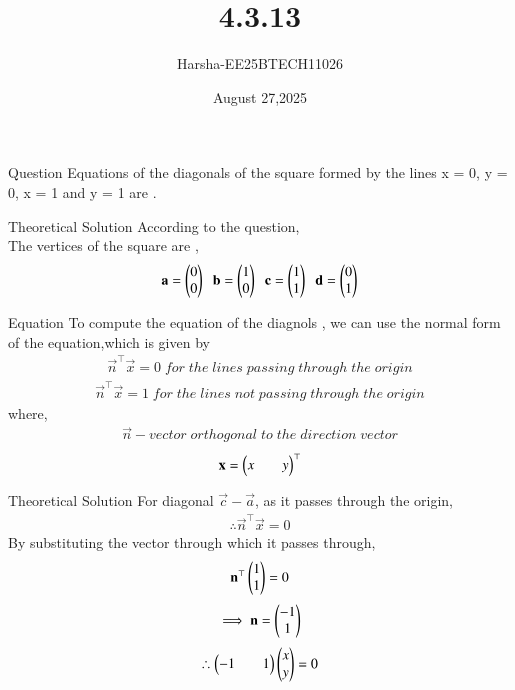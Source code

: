 \documentclass{beamer}
\title %
{4.3.13}
\date{August 27,2025}
\author %
{Harsha-EE25BTECH11026}
\begin{document}
\frame{\titlepage}
\begin{frame}{Question}
Equations of the diagonals of the square formed by the lines x = 0, y = 0, x = 1 and y = 1 are \underline{\hspace{2cm}}.
\end{frame}

\begin{frame}{Theoretical Solution}
According to the question,\\
The vertices of the square are ,
\begin{align*}
    \mathbf{a}=\begin{pmatrix}0\\0\end{pmatrix}\;\;\mathbf{b}=\begin{pmatrix}1\\0\end{pmatrix}\;\;\mathbf{c}=\begin{pmatrix}1\\1\end{pmatrix}\;\;\mathbf{d}=\begin{pmatrix}0\\1\end{pmatrix}
\end{align*}
\end{frame}

\begin{frame}{Equation}
To compute the equation of the diagnols , we can use the normal form of the equation,which is given by
\begin{align*}
    \vec{n}^{\top}\vec{x}=0 \;for \;the \;lines \;passing\;through \;the \;origin
\end{align*}
\begin{align*}
    \vec{n}^{\top}\vec{x}=1 \;for \;the \;lines \;not \;passing\;through \;the \;origin
\end{align*}
where,\\
\begin{align*}
    \vec{n}-vector\; orthogonal\; to\; the\; direction\; vector
\end{align*}
\begin{align*}
    \mathbf{x}=\begin{pmatrix}x&&y\end{pmatrix}^{\top}
\end{align*}
\end{frame}

\begin{frame}{Theoretical Solution}
For diagonal $\vec{c}-\vec{a}$, as it passes through the origin,
\begin{align*}
    \therefore \vec{n}^{\top}\vec{x}=0
\end{align*}
By substituting the vector through which it passes through,
\begin{align*}
    \mathbf{n}^{\top}\begin{pmatrix}1\\1\end{pmatrix}=0
\end{align*}
\begin{align*}
    \implies \mathbf{n}=\begin{pmatrix}-1\\1\end{pmatrix}
\end{align*}
\begin{align*}
    \therefore \begin{pmatrix}-1&&1\end{pmatrix}\begin{pmatrix}x\\y\end{pmatrix}=0
\end{align*}
\end{frame}
\end{document}
